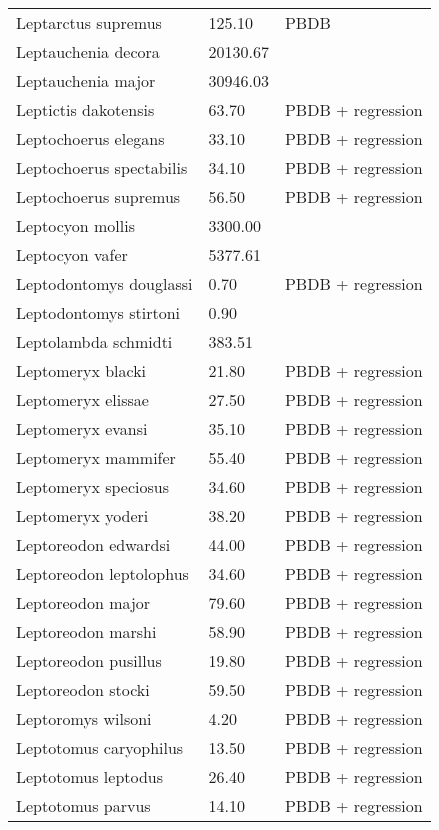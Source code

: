 \documentclass{article}
\begin{document}
\begin{center}
\begin{longtable}{p{} p{} p{}}
    Leptarctus supremus & 125.10 & PBDB \\ 
    Leptauchenia decora & 20130.67 & \cite{Tomiya2013} \\ 
    Leptauchenia major & 30946.03 & \cite{Tomiya2013} \\ 
    Leptictis dakotensis & 63.70 & PBDB + regression \\ 
    Leptochoerus elegans & 33.10 & PBDB + regression \\ 
    Leptochoerus spectabilis & 34.10 & PBDB + regression \\ 
    Leptochoerus supremus & 56.50 & PBDB + regression \\ 
    Leptocyon mollis & 3300.00 & \cite{McKenna2011} \\ 
    Leptocyon vafer & 5377.61 & \cite{Tomiya2013} \\ 
    Leptodontomys douglassi & 0.70 & PBDB + regression \\ 
    Leptodontomys stirtoni & 0.90 & \cite{Stock1937} \\ 
    Leptolambda schmidti & 383.51 & \cite{Zack2005} \\ 
    Leptomeryx blacki & 21.80 & PBDB + regression \\ 
    Leptomeryx elissae & 27.50 & PBDB + regression \\ 
    Leptomeryx evansi & 35.10 & PBDB + regression \\ 
    Leptomeryx mammifer & 55.40 & PBDB + regression \\ 
    Leptomeryx speciosus & 34.60 & PBDB + regression \\ 
    Leptomeryx yoderi & 38.20 & PBDB + regression \\ 
    Leptoreodon edwardsi & 44.00 & PBDB + regression \\ 
    Leptoreodon leptolophus & 34.60 & PBDB + regression \\ 
    Leptoreodon major & 79.60 & PBDB + regression \\ 
    Leptoreodon marshi & 58.90 & PBDB + regression \\ 
    Leptoreodon pusillus & 19.80 & PBDB + regression \\ 
    Leptoreodon stocki & 59.50 & PBDB + regression \\ 
    Leptoromys wilsoni & 4.20 & PBDB + regression \\ 
    Leptotomus caryophilus & 13.50 & PBDB + regression \\ 
    Leptotomus leptodus & 26.40 & PBDB + regression \\ 
    Leptotomus parvus & 14.10 & PBDB + regression \\ 

\end{longtable}
\end{center}
\end{document}
